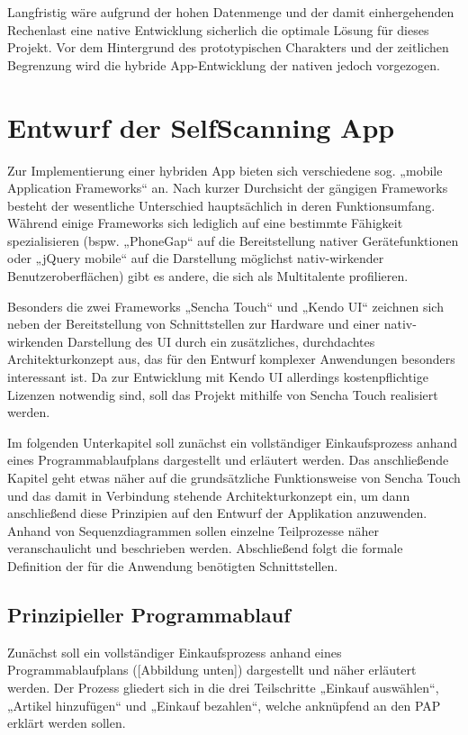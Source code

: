 Langfristig wäre aufgrund der hohen Datenmenge und der damit einhergehenden Rechenlast eine native Entwicklung sicherlich die optimale Lösung für dieses Projekt. Vor dem Hintergrund des prototypischen Charakters und der zeitlichen Begrenzung wird die hybride App-Entwicklung der nativen jedoch vorgezogen.

\chapter{Entwurf der SelfScanning App}
Zur Implementierung einer hybriden App bieten sich verschiedene sog. „mobile Application Frameworks“ an. Nach kurzer Durchsicht der gängigen Frameworks besteht der wesentliche Unterschied hauptsächlich in deren Funktionsumfang. Während einige Frameworks sich lediglich auf eine bestimmte Fähigkeit spezialisieren (bspw. „PhoneGap“ auf die Bereitstellung nativer Gerätefunktionen oder „jQuery mobile“ auf die Darstellung möglichst nativ-wirkender Benutzeroberflächen) gibt es andere, die sich als Multitalente profilieren. 

Besonders die zwei Frameworks „Sencha Touch“ und „Kendo UI“ zeichnen sich neben der Bereitstellung von Schnittstellen zur Hardware und einer nativ-wirkenden Darstellung des UI durch ein zusätzliches, durchdachtes Architekturkonzept aus, das für den Entwurf komplexer Anwendungen besonders interessant ist. Da zur Entwicklung mit Kendo UI allerdings kostenpflichtige Lizenzen notwendig sind, soll das Projekt mithilfe von Sencha Touch realisiert werden.

Im folgenden Unterkapitel soll zunächst ein vollständiger Einkaufsprozess anhand eines Programmablaufplans dargestellt und erläutert werden. Das anschließende Kapitel geht etwas näher auf die grundsätzliche Funktionsweise von Sencha Touch und das damit in Verbindung stehende Architekturkonzept ein, um dann anschließend diese Prinzipien auf den Entwurf der Applikation anzuwenden. Anhand von Sequenzdiagrammen sollen einzelne Teilprozesse näher veranschaulicht und beschrieben werden. Abschließend folgt die formale Definition der für die Anwendung benötigten Schnittstellen.

\section{Prinzipieller Programmablauf}
Zunächst soll ein vollständiger Einkaufsprozess anhand eines Programmablaufplans ([Abbildung unten]) dargestellt und näher erläutert werden. Der Prozess gliedert sich in die drei Teilschritte „Einkauf auswählen“, „Artikel hinzufügen“ und „Einkauf bezahlen“, welche anknüpfend an den PAP erklärt werden sollen.

